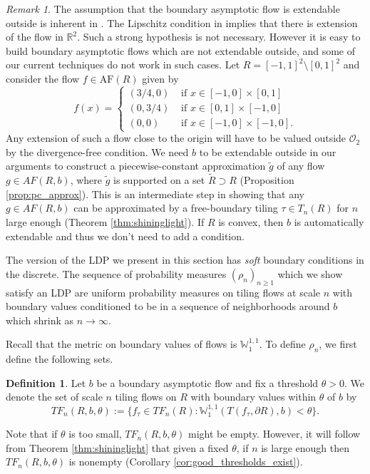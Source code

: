 \documentclass[11pt]{article}
\theoremstyle{remark}
\newtheorem{rem}[thm]{Remark}
\theoremstyle{definition}
\newtheorem{definition}[thm]{Definition}
\newcommand{\m}[1]{\mathbb{#1}}
\begin{document}
\begin{rem}\label{rem:not_extendable_problem}
The assumption that the boundary asymptotic flow is extendable outside is inherent in \cite{cohn2001variational}. The Lipschitz condition in \cite[Theorem 1.1]{cohn2001variational} implies that there is extension of the flow in $\mathbb R^2$. Such a strong hypothesis is not necessary. However it is easy to build boundary asymptotic flows which are not extendable outside, and some of our current techniques do not work in such cases. Let $R=[-1,1]^2\setminus [0,1]^2$ and consider the flow
$f\in \text{AF}(R)$ given by 
$$f(x)=\begin{cases}(3/4,0) &\text{ if }x\in [-1,0]\times[0,1]\\
(0,3/4) &\text{ if }x\in [0,1]\times[-1,0]\\
(0,0) &\text{ if }x\in [-1,0]\times[-1,0].
\end{cases}$$
Any extension of such a flow close to the origin will have to be valued outside $\mathcal O_2$ by the divergence-free condition. We need $b$ to be extendable outside in our arguments to construct a piecewise-constant approximation $\widetilde g$ of any flow $g\in AF(R,b)$, where $\widetilde g$ is supported on a set $\widetilde R\supset R$ (Proposition \ref{prop:pc_approx}). This is an intermediate step in showing that any $g\in AF(R,b)$ can be approximated by a free-boundary tiling $\tau\in T_n(R)$ for $n$ large enough (Theorem \ref{thm:shininglight}). If $R$ is convex, then $b$ is automatically extendable and thus we don't need to add a condition. 
\end{rem}

The version of the LDP we present in this section has \textit{soft} boundary conditions in the discrete. The sequence of probability measures $(\rho_n)_{n\geq 1}$ which we show satisfy an LDP are uniform probability measures on tiling flows at scale $n$ with boundary values conditioned to be in a sequence of neighborhoods around $b$ which shrink as $n\to \infty$.

Recall that the metric on boundary values of flows is $\m W_1^{1,1}$. To define $\rho_n$, we first define the following sets.
\begin{definition}
Let $b$ be a boundary asymptotic flow and fix a threshold $\theta>0$. We denote the set of scale $n$ tiling flows on $R$ with boundary values within $\theta$ of $b$ by 
$$TF_n(R,  b, \theta) := \{f_{\tau}\in TF_n(R) : \m W_1^{1,1}(T( f_\tau,\partial R), b) <\theta\}.$$
\end{definition}
Note that if $\theta$ is too small, $TF_n(R, b, \theta)$ might be empty. However, it will follow from Theorem \ref{thm:shininglight} that given a fixed $\theta$, if $n$ is large enough then $TF_n(R, b, \theta)$ is nonempty (Corollary \ref{cor:good_thresholds_exist}). 
\end{document}
